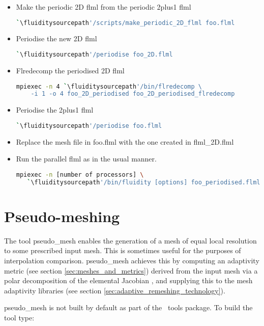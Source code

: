 \begin{itemize}
\item Make the periodic 2D flml from the periodic 2plus1 flml
\begin{lstlisting}[language=bash]
 `\fluiditysourcepath'/scripts/make_periodic_2D_flml foo.flml
\end{lstlisting}
\item Periodise the new 2D flml
\begin{lstlisting}[language=bash]
 `\fluiditysourcepath'/periodise foo_2D.flml
\end{lstlisting}
\item Flredecomp the periodised 2D flml
\begin{lstlisting}[language=bash]
mpiexec -n 4 `\fluiditysourcepath'/bin/flredecomp \
    -i 1 -o 4 foo_2D_periodised foo_2D_periodised_flredecomp
\end{lstlisting}
\item Periodise the 2plus1 flml
\begin{lstlisting}[language=bash]
 `\fluiditysourcepath'/periodise foo.flml
\end{lstlisting}
\item Replace the mesh file in foo.flml with the one created in flml\_2D.flml
\item Run the parallel flml as in the usual manner.
\begin{lstlisting}[language=bash]
mpiexec -n [number of processors] \
   `\fluiditysourcepath'/bin/fluidity [options] foo_periodised.flml
\end{lstlisting}
\end{itemize}


\section{Pseudo-meshing}

The tool pseudo\_mesh enables the generation of a mesh of equal local resolution
to some prescribed input mesh. This is sometimes useful for the purposes of
interpolation comparison. pseudo\_mesh achieves this by computing an adaptivity
metric (see section \ref{sec:meshes_and_metrics}) derived from the input mesh
via a polar decomposition of the
elemental Jacobian \citep{micheletti2006}, and supplying this to the mesh adaptivity libraries
(see section \ref{sec:adaptive_remeshing_technology}).

pseudo\_mesh is not built by default as part of the \fluidity\ tools package. To
build the tool type:

